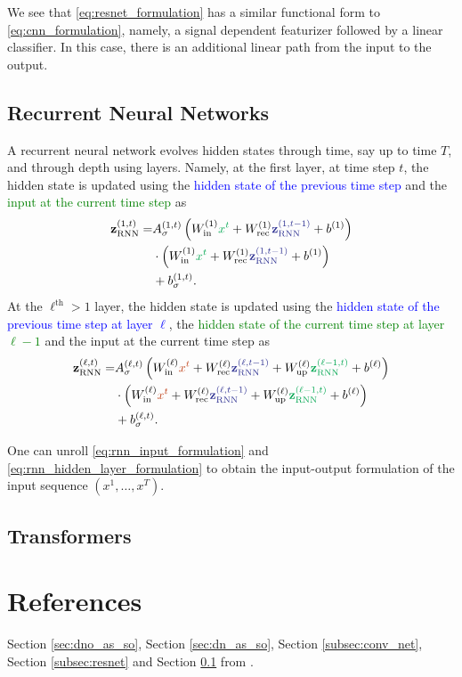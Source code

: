 We see that \eqref{eq:resnet_formulation} has a similar functional form to \eqref{eq:cnn_formulation}, namely, a signal dependent featurizer followed by a linear classifier. In this case, there is an additional linear path from the input to the output. 

\subsection{Recurrent Neural Networks}\label{subsec:rnn}

A recurrent neural network evolves hidden states through time, say up to time $T$, and through depth using layers. Namely, at the first layer, at time step $t$, the hidden state is updated using the \textcolor{Blue}{hidden state of the previous time step} and the \textcolor{Green}{input at the current time step} as
\begin{align}\label{eq:rnn_input_formulation}
    \mathbf{z}_{\text{RNN}}^{(1,t)}=&A_{\sigma}^{(1,t)}\left(W_{\text{in}}^{(1)}\textcolor{Green}{x^t}+W_{\text{rec}}^{(1)}\textcolor{Blue}{\mathbf{z}_{\text{RNN}}^{(1,t-1)}}+b^{(1)}\right)\nonumber\\&\cdot\left(W_{\text{in}}^{(1)}\textcolor{Green}{x^t}+W_{\text{rec}}^{(1)}\textcolor{Blue}{\mathbf{z}_{\text{RNN}}^{(1,t-1)}}+b^{(1)}\right)\nonumber\\&+b_{\sigma}^{(1,t)}.
\end{align}
At the $\ell^{\text{th}}>1$ layer, the hidden state is updated using the \textcolor{Blue}{hidden state of the previous time step at layer $\ell$}, the \textcolor{Green}{hidden state of the current time step at layer $\ell-1$} and the \textcolor{Bittersweet}{input at the current time step} as
\begin{align}\label{eq:rnn_hidden_layer_formulation}
    \mathbf{z}_{\text{RNN}}^{(\ell,t)}=&A_{\sigma}^{(\ell,t)}\left(W_{\text{in}}^{(\ell)}\textcolor{Bittersweet}{x^t}+W_{\text{rec}}^{(\ell)}\textcolor{Blue}{\mathbf{z}_{\text{RNN}}^{(\ell,t-1)}}+W_{\text{up}}^{(\ell)}\textcolor{Green}{\mathbf{z}_{\text{RNN}}^{(\ell-1,t)}}+b^{(\ell)}\right)\nonumber\\&\cdot\left(W_{\text{in}}^{(\ell)}\textcolor{Bittersweet}{x^t}+W_{\text{rec}}^{(\ell)}\textcolor{Blue}{\mathbf{z}_{\text{RNN}}^{(\ell,t-1)}}+W_{\text{up}}^{(\ell)}\textcolor{Green}{\mathbf{z}_{\text{RNN}}^{(\ell-1,t)}}+b^{(\ell)}\right)\nonumber\\&+b_{\sigma}^{(\ell,t)}.
\end{align}

One can unroll \eqref{eq:rnn_input_formulation} and \eqref{eq:rnn_hidden_layer_formulation} to obtain the input-output formulation of the input sequence $\left(x^1,\dots,x^T\right)$.

\subsection{Transformers}\label{subsec:transformers}

\section{References}

Section \ref{sec:dno_as_so}, Section \ref{sec:dn_as_so}, Section \ref{subsec:conv_net}, Section \ref{subsec:resnet} and Section \ref{subsec:rnn} from \citet{balestrieroMadMaxAffine2018}.